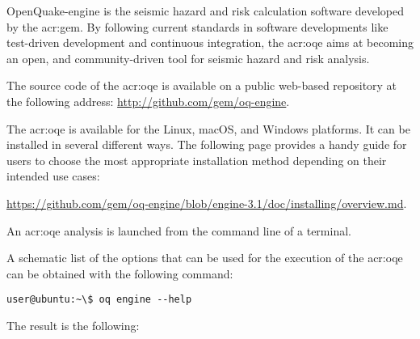 OpenQuake-engine is the seismic hazard and risk calculation software developed by
the \glsdesc{acr:gem}. By following current standards in software
developments like test-driven development and continuous integration, the
\glsdesc{acr:oqe} aims at becoming an open, and community-driven tool for
seismic hazard and risk analysis.

The source code of the \glsdesc{acr:oqe} is available on a public web-based
repository at the following address:
\href{http://github.com/gem/oq-engine}{http://github.com/gem/oq-engine}.

The \glsdesc{acr:oqe} is available for the Linux, macOS, and Windows
platforms. It can be installed in several different ways. The following page
provides a handy guide for users to choose the most appropriate installation
method depending on their intended use cases:

\href{https://github.com/gem/oq-engine/blob/engine-3.1/doc/installing/overview.md}{https://github.com/gem/oq-engine/blob/engine-3.1/doc/installing/overview.md}.

An \gls{acr:oqe} analysis is launched from the command line of a terminal.

A schematic list of the options that can be used for the execution of the
\gls{acr:oqe} can be obtained with the following command:

\begin{verbatim}
user@ubuntu:~\$ oq engine --help
\end{verbatim}

The result is the following:
\inputminted[firstline=1,fontsize=\footnotesize,frame=single]{shell-session}{oqum/help.txt}
